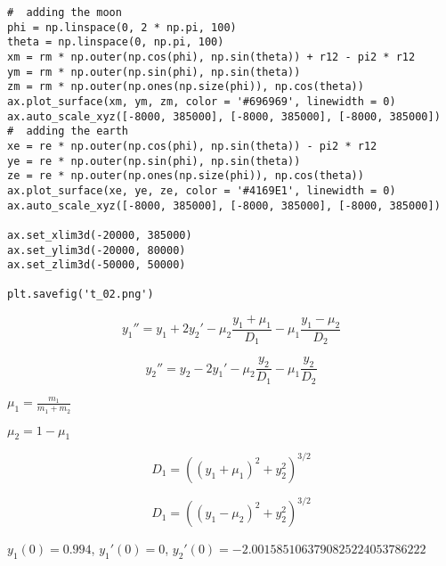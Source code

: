 \documentclass[12pt,fleqn]{article}\usepackage{../../common}
\begin{document}
\begin{verbatim}
#  adding the moon
phi = np.linspace(0, 2 * np.pi, 100)
theta = np.linspace(0, np.pi, 100)
xm = rm * np.outer(np.cos(phi), np.sin(theta)) + r12 - pi2 * r12
ym = rm * np.outer(np.sin(phi), np.sin(theta))
zm = rm * np.outer(np.ones(np.size(phi)), np.cos(theta))
ax.plot_surface(xm, ym, zm, color = '#696969', linewidth = 0)
ax.auto_scale_xyz([-8000, 385000], [-8000, 385000], [-8000, 385000])
#  adding the earth
xe = re * np.outer(np.cos(phi), np.sin(theta)) - pi2 * r12
ye = re * np.outer(np.sin(phi), np.sin(theta))
ze = re * np.outer(np.ones(np.size(phi)), np.cos(theta))
ax.plot_surface(xe, ye, ze, color = '#4169E1', linewidth = 0)
ax.auto_scale_xyz([-8000, 385000], [-8000, 385000], [-8000, 385000])

ax.set_xlim3d(-20000, 385000)
ax.set_ylim3d(-20000, 80000)
ax.set_zlim3d(-50000, 50000)

plt.savefig('t_02.png')
\end{verbatim}



















$$ 
y_1'' = y_1 + 2y_2' - \mu_2 \frac{y_1+\mu_1}{D_1} - \mu_1 \frac{y_1-\mu_2}{D_2}
$$

$$ 
y_2'' = y_2 - 2y_1' - \mu_2 \frac{y_2}{D_1} -\mu_1 \frac{y_2}{D_2}
$$

$\mu_1 = \frac{m_1}{m_1+m_2}$ 

$\mu_2 = 1-\mu_1$

$$ D_1 = ((y_1+\mu_1)^2 + y_2^2 )^{3/2}$$

$$ D_1 = ((y_1-\mu_2)^2 + y_2^2 )^{3/2}$$

$y_1(0) = 0.994$, $y_1'(0)=0$, $y_2'(0) = -2.0015851063790825224053786222$
\end{document}
